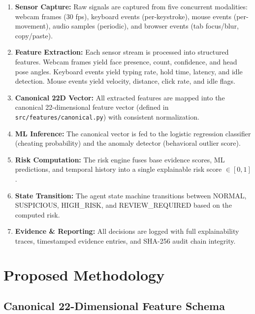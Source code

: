 \documentclass{article}
\begin{document}
\begin{enumerate}
    \item \textbf{Sensor Capture:} Raw signals are captured from five concurrent modalities: webcam frames (30 fps), keyboard events (per-keystroke), mouse events (per-movement), audio samples (periodic), and browser events (tab focus/blur, copy/paste).

    \item \textbf{Feature Extraction:} Each sensor stream is processed into structured features. Webcam frames yield face presence, count, confidence, and head pose angles. Keyboard events yield typing rate, hold time, latency, and idle detection. Mouse events yield velocity, distance, click rate, and idle flags.

    \item \textbf{Canonical 22D Vector:} All extracted features are mapped into the canonical 22-dimensional feature vector (defined in \texttt{src/features/canonical.py}) with consistent normalization.

    \item \textbf{ML Inference:} The canonical vector is fed to the logistic regression classifier (cheating probability) and the anomaly detector (behavioral outlier score).

    \item \textbf{Risk Computation:} The risk engine fuses base evidence scores, ML predictions, and temporal history into a single explainable risk score $\in [0, 1]$.

    \item \textbf{State Transition:} The agent state machine transitions between NORMAL, SUSPICIOUS, HIGH\_RISK, and REVIEW\_REQUIRED based on the computed risk.

    \item \textbf{Evidence \& Reporting:} All decisions are logged with full explainability traces, timestamped evidence entries, and SHA-256 audit chain integrity.
\end{enumerate}

\section{Proposed Methodology}
\label{sec:methodology}

\subsection{Canonical 22-Dimensional Feature Schema}
\end{document}
